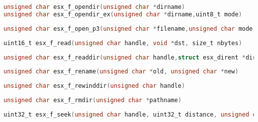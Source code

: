 \documentclass[11pt]{book}
\def\lthtmlcheckvsize{\ifdim\ht\sizebox<\vsize 
  \ifdim\wd\sizebox<\hsize\expandafter\hfill\fi \expandafter\vfill
  \else\expandafter\vss\fi}%
\begin{document}
{\newpage\clearpage
{}%
\begin{lstlisting}[language=C]
unsigned char esx_f_opendir(unsigned char *dirname)
unsigned char esx_f_opendir_ex(unsigned char *dirname,uint8_t mode)
\end{lstlisting}%
\lthtmlfigureZ
\lthtmlcheckvsize\clearpage}

{\newpage\clearpage
{}%
\begin{lstlisting}[language=C]
unsigned char esx_f_open_p3(unsigned char *filename,unsigned char mode,struct esx_p3_hdr *h)
\end{lstlisting}%
\lthtmlfigureZ
\lthtmlcheckvsize\clearpage}

{\newpage\clearpage
{}%
\begin{lstlisting}[language=C]
uint16_t esx_f_read(unsigned char handle, void *dst, size_t nbytes)
\end{lstlisting}%
\lthtmlfigureZ
\lthtmlcheckvsize\clearpage}

{\newpage\clearpage
{}%
\begin{lstlisting}[language=C]
unsigned char esx_f_readdir(unsigned char handle,struct esx_dirent *dirent)
\end{lstlisting}%
\lthtmlfigureZ
\lthtmlcheckvsize\clearpage}

{\newpage\clearpage
{}%
\begin{lstlisting}[language=C]
unsigned char esx_f_rename(unsigned char *old, unsigned char *new)
\end{lstlisting}%
\lthtmlfigureZ
\lthtmlcheckvsize\clearpage}

{\newpage\clearpage
{}%
\begin{lstlisting}[language=C]
unsigned char esx_f_rewinddir(unsigned char handle)
\end{lstlisting}%
\lthtmlfigureZ
\lthtmlcheckvsize\clearpage}

{\newpage\clearpage
{}%
\begin{lstlisting}[language=C]
unsigned char esx_f_rmdir(unsigned char *pathname)
\end{lstlisting}%
\lthtmlfigureZ
\lthtmlcheckvsize\clearpage}

{\newpage\clearpage
{}%
\begin{lstlisting}[language=C]
uint32_t esx_f_seek(unsigned char handle, uint32_t distance, unsigned char whence)
\end{lstlisting}%
\lthtmlfigureZ
\lthtmlcheckvsize\clearpage}
\end{document}
